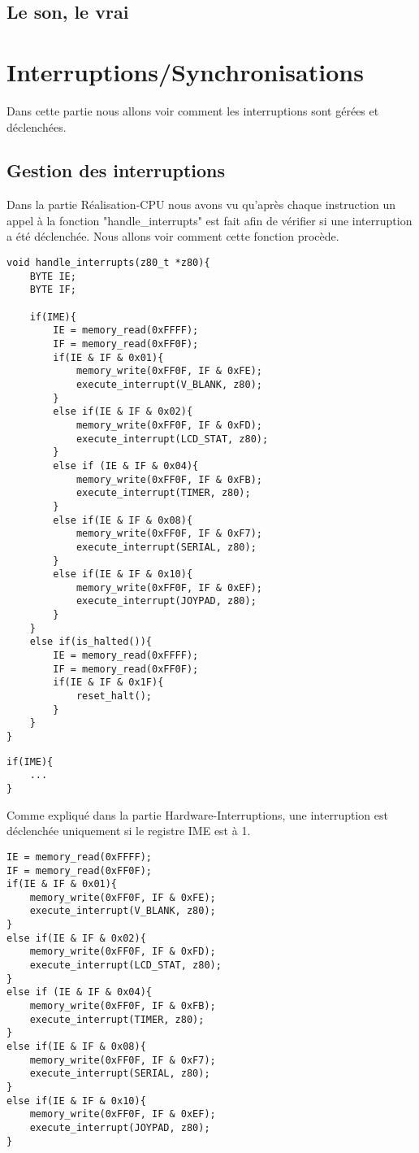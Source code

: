 \documentclass{report}
\begin{document}
\subsection{Le son, le vrai}
\section{Interruptions/Synchronisations}
Dans cette partie nous allons voir comment les interruptions sont gérées et déclenchées. 
\subsection{Gestion des interruptions}
Dans la partie Réalisation-CPU nous avons vu qu'après chaque instruction un appel à la fonction "handle\_interrupts" est fait afin de vérifier si une interruption a été déclenchée. Nous allons voir comment cette fonction procède.
\begin{lstlisting}
void handle_interrupts(z80_t *z80){
	BYTE IE;
	BYTE IF;

	if(IME){
		IE = memory_read(0xFFFF);
		IF = memory_read(0xFF0F);
		if(IE & IF & 0x01){
			memory_write(0xFF0F, IF & 0xFE);
			execute_interrupt(V_BLANK, z80);
		}
		else if(IE & IF & 0x02){
			memory_write(0xFF0F, IF & 0xFD);
			execute_interrupt(LCD_STAT, z80);
		}
		else if (IE & IF & 0x04){
			memory_write(0xFF0F, IF & 0xFB);
			execute_interrupt(TIMER, z80);
		}
		else if(IE & IF & 0x08){
			memory_write(0xFF0F, IF & 0xF7);
			execute_interrupt(SERIAL, z80);
		}
		else if(IE & IF & 0x10){
			memory_write(0xFF0F, IF & 0xEF);
			execute_interrupt(JOYPAD, z80);
		}
	}
	else if(is_halted()){
		IE = memory_read(0xFFFF);
		IF = memory_read(0xFF0F);
		if(IE & IF & 0x1F){
			reset_halt();
		}
	}
}
\end{lstlisting}
\begin{lstlisting}
if(IME){
	...
}
\end{lstlisting}
Comme expliqué dans la partie Hardware-Interruptions, une interruption est déclenchée uniquement si le registre IME est à 1. 
\begin{lstlisting}
IE = memory_read(0xFFFF);
IF = memory_read(0xFF0F);
if(IE & IF & 0x01){
	memory_write(0xFF0F, IF & 0xFE);
	execute_interrupt(V_BLANK, z80);
}
else if(IE & IF & 0x02){
	memory_write(0xFF0F, IF & 0xFD);
	execute_interrupt(LCD_STAT, z80);
}
else if (IE & IF & 0x04){
	memory_write(0xFF0F, IF & 0xFB);
	execute_interrupt(TIMER, z80);
}
else if(IE & IF & 0x08){
	memory_write(0xFF0F, IF & 0xF7);
	execute_interrupt(SERIAL, z80);
}
else if(IE & IF & 0x10){
	memory_write(0xFF0F, IF & 0xEF);
	execute_interrupt(JOYPAD, z80);
}
\end{lstlisting}
\end{document}
